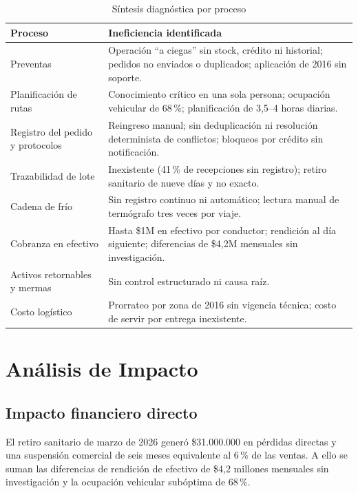 \begin{table}[htbp]
\centering
\small
\caption{Síntesis diagnóstica por proceso}
\label{tab:diagnostico}
\begin{tabularx}{\textwidth}{@{}L{4.2cm}X@{}}
\toprule
\textbf{Proceso} & \textbf{Ineficiencia identificada} \\
\midrule
Preventas &
Operación ``a ciegas'' sin stock, crédito ni historial; pedidos no enviados o
duplicados; aplicación de 2016 sin soporte. \\
\addlinespace
Planificación de rutas &
Conocimiento crítico en una sola persona; ocupación vehicular de 68\,\%;
planificación de 3,5--4 horas diarias. \\
\addlinespace
Registro del pedido y protocolos &
Reingreso manual; sin deduplicación ni resolución determinista de conflictos;
bloqueos por crédito sin notificación. \\
\addlinespace
Trazabilidad de lote &
Inexistente (41\,\% de recepciones sin registro); retiro sanitario de nueve días y no
exacto. \\
\addlinespace
Cadena de frío &
Sin registro continuo ni automático; lectura manual de termógrafo tres veces por
viaje. \\
\addlinespace
Cobranza en efectivo &
Hasta \$1M en efectivo por conductor; rendición al día siguiente; diferencias de
\$4,2M mensuales sin investigación. \\
\addlinespace
Activos retornables y mermas &
Sin control estructurado ni causa raíz. \\
\addlinespace
Costo logístico &
Prorrateo por zona de 2016 sin vigencia técnica; costo de servir por entrega
inexistente. \\
\bottomrule
\end{tabularx}
\end{table}

\section{Análisis de Impacto}

\subsection{Impacto financiero directo}

El retiro sanitario de marzo de 2026 generó \$31.000.000 en pérdidas directas y una
suspensión comercial de seis meses equivalente al 6\,\% de las ventas. A ello se suman
las diferencias de rendición de efectivo de \$4,2 millones mensuales sin investigación y
la ocupación vehicular subóptima de 68\,\%.

